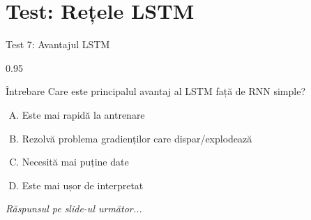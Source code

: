 \documentclass[9pt, aspectratio=169, t]{beamer}
\begin{document}
\section{Test: Rețele LSTM}

\begin{frame}{Test 7: Avantajul LSTM}
    \begin{cminipage}{0.95\textwidth}
    \begin{alertblock}{Întrebare}
        Care este principalul avantaj al LSTM față de RNN simple?
    \end{alertblock}

    \vspace{0.3cm}

    \begin{enumerate}[A)]\setlength{\itemsep}{0pt}
        \item Este mai rapidă la antrenare
        \item Rezolvă problema gradienților care dispar/explodează
        \item Necesită mai puține date
        \item Este mai ușor de interpretat
    \end{enumerate}

    \vspace{0.5cm}
    \begin{flushright}\textit{Răspunsul pe slide-ul următor...}\end{flushright}
    \end{cminipage}
\end{frame}
\end{document}

